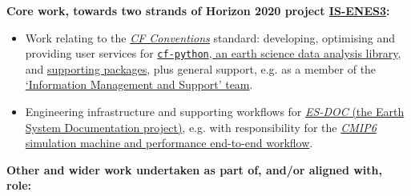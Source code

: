 \documentclass[10pt,a4paper]{cv_template}
\begin{document}
\begin{paracol}{2}




\textbf{Core work, towards two strands of Horizon 2020 project \href{https://is.enes.org/}{IS-ENES3}:}
\begin{itemize}
\itemsep0em
  \item Work relating to the \href{https://cfconventions.org/}{\textit{CF Conventions}} standard: developing, optimising and providing user services for \href{https://github.com/NCAS-CMS/cf-python}{\texttt{cf-python}, an earth science data analysis library}, and \href{https://hps.vi4io.org/_media/events/2020/summer-school-cfnetcdf.pdf}{supporting packages}, plus general support, e.g. as a member of the \href{https://cfconventions.org/governance.html}{`Information Management and Support' team}.
  \item Engineering infrastructure and supporting workflows for \href{https://github.com/ES-DOC/}{\textit{ES-DOC} (the Earth System Documentation project)}, e.g. with responsibility for the \href{https://es-doc.org/cmip6-machine-and-performance/}{\textit{CMIP6} simulation machine and performance end-to-end workflow}.
\end{itemize}

\textbf{Other and wider work undertaken as part of, and/or aligned with, role:}


\end{paracol}
\end{document}
